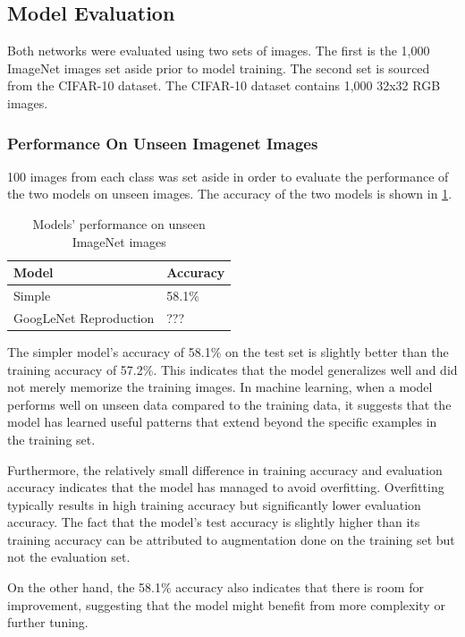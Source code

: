 \documentclass{article}
\begin{document}
\subsection{Model Evaluation}
Both networks were evaluated using two sets of images. The first is the 1,000 ImageNet images set aside prior to model training. The second set is sourced from the CIFAR-10 dataset\cite{kim_cifar10_images}. The CIFAR-10 dataset contains 1,000 32x32 RGB images.

\subsubsection{Performance On Unseen Imagenet Images}
100 images from each class was set aside in order to evaluate the performance of the two models on unseen images. The accuracy of the two models is shown in \ref{tab:perf-unseen-imagenet}.

\begin{table}[ht]
    \centering
    \begin{tabular}{ll}
    \hline
    \textbf{Model} & \textbf{Accuracy} \\ \hline
    Simple & 58.1\% \\ \hline
    GoogLeNet Reproduction & ??? \\ \hline
    \end{tabular}
    \caption{Models' performance on unseen ImageNet images}
    \label{tab:perf-unseen-imagenet}
\end{table}

The simpler model's accuracy of 58.1\% on the test set is slightly better than the training accuracy of 57.2\%. This indicates that the model generalizes well and did not merely memorize the training images. In machine learning, when a model performs well on unseen data compared to the training data, it suggests that the model has learned useful patterns that extend beyond the specific examples in the training set.

Furthermore, the relatively small difference in training accuracy and evaluation accuracy indicates that the model has managed to avoid overfitting. Overfitting typically results in high training accuracy but significantly lower evaluation accuracy. The fact that the model's test accuracy is slightly higher than its training accuracy can be attributed to augmentation done on the training set but not the evaluation set.

On the other hand, the 58.1\% accuracy also indicates that there is room for improvement, suggesting that the model might benefit from more complexity or further tuning.
\end{document}
